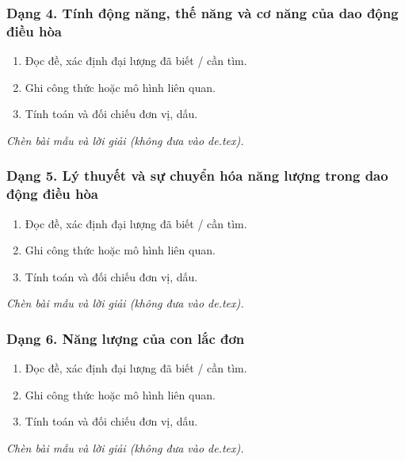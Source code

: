 \subsubsection{Dạng 4. Tính động năng, thế năng và cơ năng của dao động điều hòa}
\begin{phuongphap}
\begin{enumerate}
\item Đọc đề, xác định đại lượng đã biết / cần tìm.
\item Ghi công thức hoặc mô hình liên quan.
\item Tính toán và đối chiếu đơn vị, dấu.
\end{enumerate}
\end{phuongphap}
\begin{vidumau}
\textit{Chèn bài mẫu và lời giải (không đưa vào de.tex).}
\end{vidumau}

\subsubsection{Dạng 5. Lý thuyết và sự chuyển hóa năng lượng trong dao động điều hòa}
\begin{phuongphap}
\begin{enumerate}
\item Đọc đề, xác định đại lượng đã biết / cần tìm.
\item Ghi công thức hoặc mô hình liên quan.
\item Tính toán và đối chiếu đơn vị, dấu.
\end{enumerate}
\end{phuongphap}
\begin{vidumau}
\textit{Chèn bài mẫu và lời giải (không đưa vào de.tex).}
\end{vidumau}

\subsubsection{Dạng 6. Năng lượng của con lắc đơn}
\begin{phuongphap}
\begin{enumerate}
\item Đọc đề, xác định đại lượng đã biết / cần tìm.
\item Ghi công thức hoặc mô hình liên quan.
\item Tính toán và đối chiếu đơn vị, dấu.
\end{enumerate}
\end{phuongphap}
\begin{vidumau}
\textit{Chèn bài mẫu và lời giải (không đưa vào de.tex).}
\end{vidumau}

